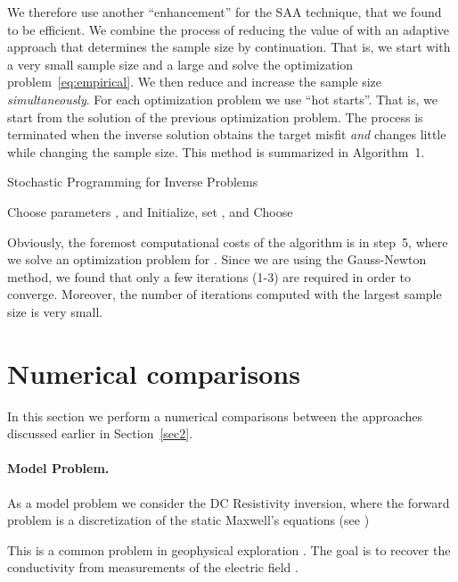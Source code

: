 \documentclass[12pt]{article}
\begin{document}
We therefore use another ``enhancement'' for the SAA technique, that we found to be efficient. We combine the process of reducing the value of  with an adaptive approach that determines the sample size by continuation. That is, we start with a very small sample size and a large  and solve the optimization problem~\eqref{eq:empirical}. We then reduce  and increase the sample size {\em simultaneously}.
For each optimization problem we use ``hot starts''. That is, we start from the solution of the previous optimization problem. The process is terminated when the inverse solution obtains the target misfit {\em and} changes little while changing the sample size. This method is summarized in Algorithm~1.
\begin{algorithm}
\caption{Stochastic Programming for Inverse Problems}
\begin{algorithmic}[1]
\STATE Choose parameters ,  and 
\STATE Initialize, set , and 
\STATE Choose 
\IF{  }
\STATE{ }
\ENDIF
\IF{  }
\ENDIF
{}
\STATE 
 \ENDWHILE
 \end{algorithmic}
\label{al:al1}
\end{algorithm}

Obviously, the foremost computational costs of the algorithm is in step~5, where we solve an optimization problem for . Since we are using the Gauss-Newton method, we found that only a few iterations (1-3) are required in order to converge. Moreover, the number of iterations computed with the largest sample size is very small.

\section{Numerical comparisons}
\label{sec4}

In this section we perform a numerical comparisons between the approaches discussed earlier in Section~\ref{sec2}.

\paragraph{Model Problem.} As a model problem we consider the DC Resistivity inversion, where the forward problem is a discretization of the static Maxwell's equations (see \cite{hao2,na})

This is a common problem in geophysical exploration \cite{wardhow}. The goal is to recover the conductivity  from measurements of the electric field .
\end{document}
